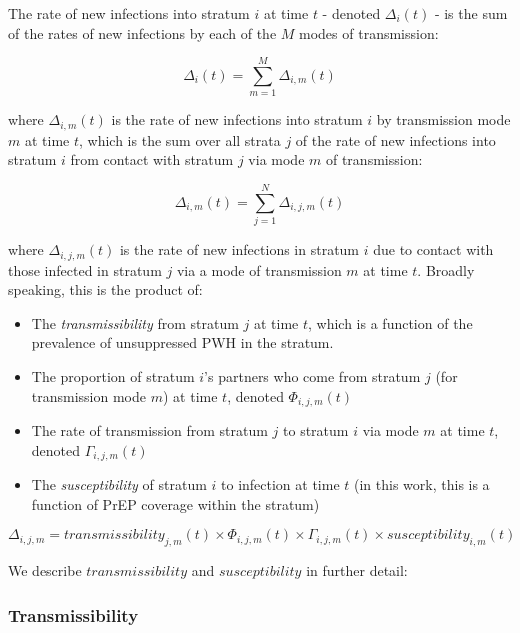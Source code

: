 \documentclass{article}
\begin{document}
The rate of new infections into stratum $i$ at time $t$ - denoted $\Delta_i(t)$ - is the sum of the rates of new infections by each of the $M$ modes of transmission:

\begin{equation}
\Delta_i(t) = \sum_{m=1}^M \Delta_{i,m}(t)
\end{equation}

where $\Delta_{i,m}(t)$ is the rate of new infections into stratum $i$ by transmission mode $m$ at time $t$, which is the sum over all strata $j$ of the rate of new infections into stratum $i$ from contact with stratum $j$ via mode $m$ of transmission:

\begin{equation}
\Delta_{i,m}(t) = \sum_{j=1}^N \Delta_{i,j,m}(t)
\end{equation}

where $\Delta_{i,j,m}(t)$ is the rate of new infections in stratum $i$ due to contact with those infected in stratum $j$ via a mode of transmission $m$ at time $t$. Broadly speaking, this is the product of:

\begin{itemize}
	\item The \textit{transmissibility} from stratum $j$ at time $t$, which is a function of the prevalence of unsuppressed PWH in the stratum.
	\item The proportion of stratum $i$'s partners who come from stratum $j$ (for transmission mode $m$) at time $t$, denoted $\Phi_{i,j,m}(t)$
	\item The rate  of transmission from stratum $j$ to stratum $i$ via mode $m$ at time $t$, denoted $\Gamma_{i,j,m}(t)$
	\item The \textit{susceptibility} of stratum $i$ to infection at time $t$ (in this work, this is a function of PrEP coverage within the stratum)
\end{itemize}

\begin{equation}
\Delta_{i,j,m} = transmissibility_{j,m}(t) \times \Phi_{i,j,m}(t) \times \Gamma_{i,j,m}(t) \times susceptibility_{i,m}(t)
\end{equation}

We describe $transmissibility$ and $susceptibility$ in further detail:

\subsubsection{Transmissibility}
\end{document}
